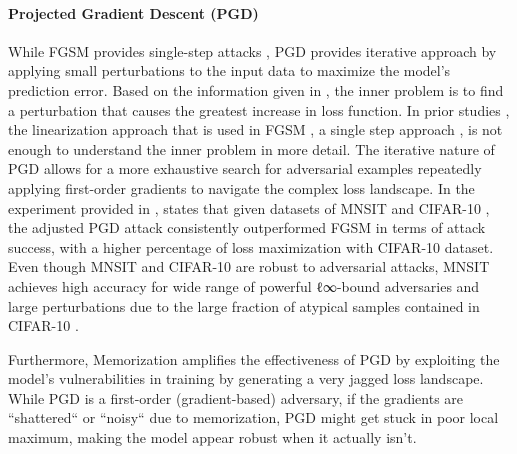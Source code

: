 \paragraph{Projected Gradient Descent (PGD)}
While FGSM provides single-step attacks , PGD provides iterative approach by applying small perturbations to the input data to maximize the model’s prediction error. Based on the information given in \cite{aleksander_m_dry_8d27e246}, the inner problem is to find a perturbation that causes the greatest increase in loss function. In prior studies , the linearization approach that is used in FGSM , a single step approach , is not enough to understand the inner problem in more detail. The iterative nature of PGD allows for a more exhaustive search for adversarial examples repeatedly applying first-order gradients to navigate the complex loss landscape. In the experiment provided in \cite{aleksander_m_dry_8d27e246}, states that given datasets of MNSIT and CIFAR-10 , the adjusted PGD attack consistently outperformed FGSM in terms of attack success, with a higher percentage  of loss maximization with CIFAR-10 dataset. Even though MNSIT and CIFAR-10 are robust to adversarial attacks, MNSIT achieves high accuracy for wide range of powerful ℓ∞-bound adversaries and large perturbations due to the large fraction of atypical samples contained in CIFAR-10 .

Furthermore, Memorization amplifies the effectiveness of PGD by exploiting the model’s vulnerabilities in training by generating a very jagged loss landscape. While PGD is a first-order (gradient-based) adversary, if the gradients are “shattered“ or “noisy“ due to memorization, PGD might get stuck in poor local maximum, making the model appear  robust when it actually isn’t.

\clearpage

